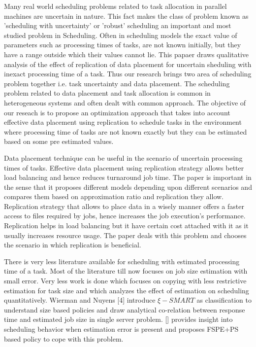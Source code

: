 \documentclass[10pt, conference, compsocconf]{IEEEtran}
\begin{document}
Many real world scheduling problems related to task allocation in parallel machines are uncertain in nature. This fact makes the class of problem  known as 'scheduling with uncertainty' or 'robust' scheduling an important and most studied problem in Scheduling.  Often in  scheduling models the exact value of parameters such as processing times of tasks, are not known initially,   but they have a range outside which their values cannot  lie.  This papaer draws qualitative analysis of the effect of replication of data placement for uncertain sheduling with inexact processing time of a task. Thus  our research brings two area of scheduling problem together i.e. task uncertainty and data placement.  The scheduling problem related to data placement and task allocation is common in heterogeneous systems and often dealt with common approach.  The objective of our reseach  is to propose an optimization approach that takes into account  effective data placement using replication to schedule  tasks in the environment where processing time of tasks are not known exactly but they can be estimated based on some pre estimated values.

Data placement technique can be useful in the scenario of uncertain processing times of tasks. Effective data placement using replication strategy allows better load balancing and hence reduces turnaround job time.   The paper is important in the sense that it proposes different models depending upon different scenarios and compares them based on approximation ratio and replication they allow.  Replication strategy that allows to place data in a wisely manner  offers a faster access to files required by  jobs, hence increases the job execution’s performance. Replication helps in load balancing but it have certain cost attached with it as it usually increases resource usage\cite{IEEEhowto:wang}.  The paper deals with this problem and chooses the scenario in which replication is beneficial. 


There is very less literature available for scheduling with estimated processing time of a task.  Most of the literature till now focuses on job size estimation with small error.  Very less work is done which focuses on copying with less restrictive estimation for task size and which analyzes the effect of estimation on scheduling quantitatively.   Wierman and Nuyens [4] introduce $ \xi-SMART$ as classification to understand size based policies and draw analytical co-relation between response time and estimated job size in single server problem. [] provides insight into scheduling behavior when estimation error is present and proposes FSPE+PS based policy to cope with this problem.
 
\end{document}

